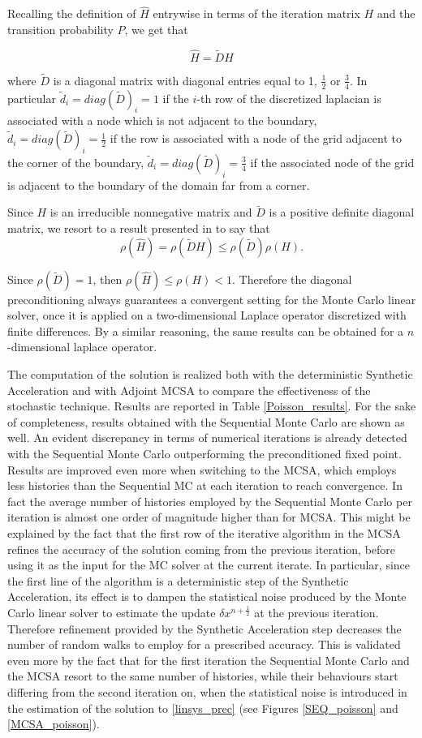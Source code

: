 \documentclass[a4paper,10pt]{article}
\begin{document}
Recalling the definition of $\hat{H}$ entrywise in terms of the 
iteration matrix $H$ and the transition probability $P$, we get that 

\[
 \hat{H}=\tilde{D}H
\]

where $\tilde{D}$ is a diagonal matrix with diagonal entries equal to
1, $\frac{1}{2}$ or $\frac{3}{4}$. 
In particular $\tilde{d}_i=diag(\tilde D)_i=1$ if the $i$-th row of the 
discretized laplacian is associated with a node which is not adjacent to the 
boundary, $\tilde{d}_i=diag(\tilde D)_i=\frac{1}{2}$ if the row is associated 
with a node of the grid adjacent to the corner of the boundary, 
$\tilde{d}_i=diag(\tilde D)_i=\frac{3}{4}$ if the associated node of the grid 
is adjacent to the boundary of the domain far from a corner. 

Since $H$ is an irreducible nonnegative matrix and $\tilde{D}$ is a 
positive definite diagonal matrix, we resort to a result presented in 
\cite{FK1975} to say that
\[
 \rho(\hat{H})=\rho(\tilde{D}H)\le \rho(\tilde D)\rho(H).
\]

Since $\rho(\tilde{D})=1$, then $\rho(\hat{H})\le \rho(H)<1$. 
Therefore the diagonal preconditioning always guarantees a convergent 
setting for the Monte Carlo linear solver, once it is applied on a 
two-dimensional Laplace 
operator discretized with finite differences. By a similar reasoning, the same 
results can be obtained for a $n$-dimensional laplace operator. 


The computation of the solution is realized both with the deterministic 
Synthetic Acceleration and with Adjoint MCSA to compare the effectiveness of 
the 
stochastic technique. Results are reported in Table  
\ref{Poisson_results}. For the sake of completeness, results obtained with 
the Sequential Monte Carlo are shown as well. An evident discrepancy in terms 
of numerical iterations 
is already detected with the Sequential Monte Carlo outperforming the 
preconditioned fixed point. Results are improved even more 
when 
switching to the MCSA, which employs less histories than the Sequential MC at 
each iteration to 
reach convergence. In fact the average number of histories employed by the 
Sequential 
Monte Carlo per iteration is almost one order of magnitude higher than for 
MCSA. This 
might be explained by the fact that the first row of the iterative algorithm in 
the MCSA refines the accuracy of the solution coming from the previous 
iteration, 
before using it as the input for the MC solver at the current iterate. 
In particular, since the first line of the algorithm is a deterministic step of 
the Synthetic Acceleration, its effect is to dampen the statistical noise 
produced by the Monte Carlo linear solver to estimate the update $\delta 
x^{n + \frac{1}{2}}$ at the previous iteration. Therefore
refinement provided by the Synthetic Acceleration step decreases the number of 
random walks 
to employ for a prescribed accuracy. This is validated even more by the fact 
that for the first iteration the Sequential Monte Carlo and the MCSA resort to 
the same number of histories, while their behaviours start differing from the 
second iteration on, when the statistical noise is introduced in the estimation 
of the solution to \ref{linsys_prec} (see Figures \ref{SEQ_poisson} and 
\ref{MCSA_poisson}).
\end{document}

